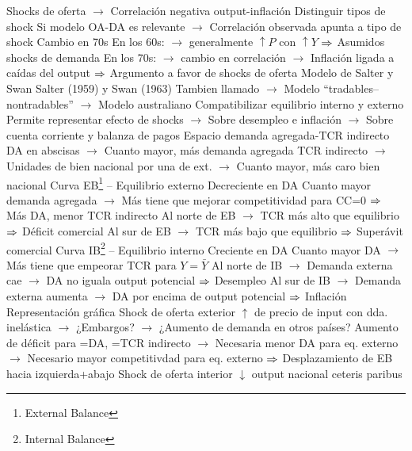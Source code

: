 \documentclass{nuevotema}
\begin{document}
\begin{esquemal}
				\4[] Shocks de oferta
				\4[] $\to$ Correlación negativa output-inflación
				\4[] 
				\4 Distinguir tipos de shock
				\4[] Si modelo OA-DA es relevante
				\4[] $\to$ Correlación observada apunta a tipo de shock
				\4 Cambio en 70s
				\4[] En los 60s:
				\4[] $\to$ generalmente $\uparrow P$ con $\uparrow Y$
				\4[] $\Rightarrow$ Asumidos shocks de demanda
				\4[] En los 70s:
				\4[] $\to$ cambio en correlación
				\4[] $\to$ Inflación ligada a caídas del output
				\4[] $\Rightarrow$ Argumento a favor de shocks de oferta
			\3 Modelo de Salter y Swan
				\4 Salter (1959) y Swan (1963)
				\4[] Tambien llamado
				\4[] $\to$ Modelo ``tradables--nontradables''
				\4[] $\to$ Modelo australiano
				\4[] Compatibilizar equilibrio interno y externo
				\4[] Permite representar efecto de shocks
				\4[] $\to$ Sobre desempleo e inflación
				\4[] $\to$ Sobre cuenta corriente y balanza de pagos
				\4 Espacio demanda agregada-TCR indirecto
				\4[] DA en abscisas
				\4[] $\to$ Cuanto mayor, más demanda agregada
				\4[] TCR indirecto
				\4[] $\to$ Unidades de bien nacional por una de ext.
				\4[] $\to$ Cuanto mayor, más caro bien nacional
				\4 Curva EB\footnote{External Balance} -- Equilibrio externo
				\4[] Decreciente en DA
				\4[] Cuanto mayor demanda agregada
				\4[] $\to$ Más tiene que mejorar competitividad para CC=0
				\4[] $\Rightarrow$ Más DA, menor TCR indirecto
				\4[] Al norte de EB
				\4[] $\to$ TCR más alto que equilibrio
				\4[] $\Rightarrow$ Déficit comercial
				\4[] Al sur de EB
				\4[] $\to$ TCR más bajo que equilibrio
				\4[] $\Rightarrow$ Superávit comercial
				\4 Curva IB\footnote{Internal Balance} -- Equilibrio interno
				\4[] Creciente en DA
				\4[] Cuanto mayor DA
				\4[] $\to$ Más tiene que empeorar TCR para $Y=\bar{Y}$
				\4[] Al norte de IB
				\4[] $\to$ Demanda externa cae
				\4[] $\to$ DA no iguala output potencial
				\4[] $\Rightarrow$ Desempleo
				\4[] Al sur de IB
				\4[] $\to$ Demanda externa aumenta
				\4[] $\to$ DA por encima de output potencial
				\4[] $\Rightarrow$ Inflación
				\4 Representación gráfica
				\4[] 
				\4 Shock de oferta exterior
				\4[] $\uparrow$ de precio de input con dda. inelástica
				\4[] $\to$ ¿Embargos?
				\4[] $\to$ ¿Aumento de demanda en otros países?
				\4[] Aumento de déficit para =DA, =TCR indirecto
				\4[] $\to$ Necesaria menor DA para eq. externo
				\4[] $\to$ Necesario mayor competitivdad para eq. externo
				\4[] $\Rightarrow$ Desplazamiento de EB hacia izquierda+abajo
				\4[] 
				\4 Shock de oferta interior
				\4[] $\downarrow$ output nacional ceteris paribus

\end{esquemal}
\end{document}
